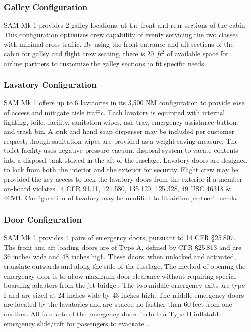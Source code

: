 \subsubsection{Galley Configuration}
SAM Mk 1 provides 2 galley locations, at the front and rear sections of the cabin.  This configuration optimizes crew capability of evenly servicing the two classes with minimal cross traffic.  By using the front entrance and aft sections of the cabin for galley and flight crew seating, there is 20 $ft^2$ of available space for airline partners to customize the galley sections to fit specific needs.
\clearpage 

\subsubsection{Lavatory Configuration}
SAM Mk 1 offers up to 6 lavatories in its 3,500 NM configuration to provide ease of access and mitigate aisle traffic.  Each lavatory is equipped with internal lighting, toilet facility, sanitation wipes, ash tray, emergency assistance button, and trash bin.  A sink and hand soap dispenser may be included per customer request; though sanitation wipes are provided as a weight saving measure.  The toilet facility uses negative pressure vacuum disposal system to vacate contents into a disposal tank stowed in the aft of the fuselage.\cite{toilet}  Lavatory doors are designed to lock from both the interior and the exterior for security.  Flight crew may be provided the key access to lock the lavatory doors from the exterior if a member on-board violates 14 CFR 91.11, 121.580, 135.120, 125.328, 49 USC 46318 \& 46504.  Configuration of lavatory may be modified to fit airline partner's needs.

\subsubsection{Door Configuration}
SAM Mk 1 provides 4 pairs of emergency doors, pursuant to 14 CFR \S25.807.  The front and aft loading doors are of Type A, defined by CFR \S25.813 and are 36 inches wide and 48 inches high.  These doors, when unlocked and activated, translate outwards and along the side of the fuselage.  The method of opening the emergency door is to allow maximum door clearance without requiring special boarding adapters from the jet bridge \cite{cfr}.  The two middle emergency exits are type I and are sized at 24 inches wide by 48 inches high.  The middle emergency doors are located by the lavatories and are spaced no farther than 60 feet from one another.  All four sets of the emergency doors include a Type II inflatable emergency slide/raft for passengers to evacuate \cite{slides}.

